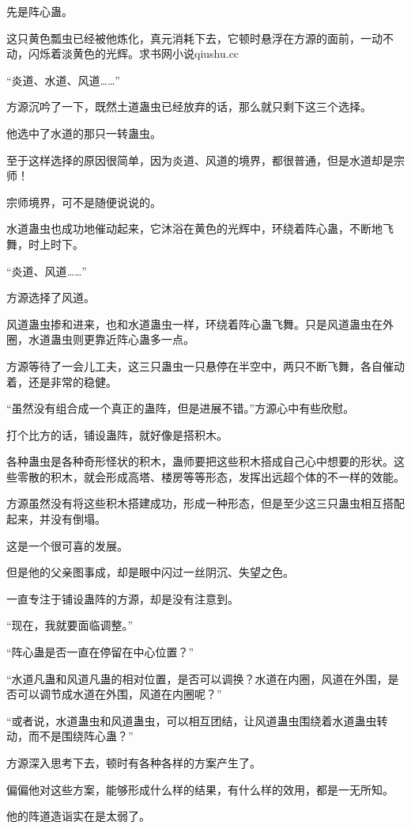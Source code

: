 \begin{this_body}
先是阵心蛊。

这只黄色瓢虫已经被他炼化，真元消耗下去，它顿时悬浮在方源的面前，一动不动，闪烁着淡黄色的光辉。求书网小说qiushu.cc

“炎道、水道、风道……”

方源沉吟了一下，既然土道蛊虫已经放弃的话，那么就只剩下这三个选择。

他选中了水道的那只一转蛊虫。

至于这样选择的原因很简单，因为炎道、风道的境界，都很普通，但是水道却是宗师！

宗师境界，可不是随便说说的。

水道蛊虫也成功地催动起来，它沐浴在黄色的光辉中，环绕着阵心蛊，不断地飞舞，时上时下。

“炎道、风道……”

方源选择了风道。

风道蛊虫掺和进来，也和水道蛊虫一样，环绕着阵心蛊飞舞。只是风道蛊虫在外圈，水道蛊虫则更靠近阵心蛊多一点。

方源等待了一会儿工夫，这三只蛊虫一只悬停在半空中，两只不断飞舞，各自催动着，还是非常的稳健。

“虽然没有组合成一个真正的蛊阵，但是进展不错。”方源心中有些欣慰。

打个比方的话，铺设蛊阵，就好像是搭积木。

各种蛊虫是各种奇形怪状的积木，蛊师要把这些积木搭成自己心中想要的形状。这些零散的积木，就会形成高塔、楼房等等形态，发挥出远超个体的不一样的效能。

方源虽然没有将这些积木搭建成功，形成一种形态，但是至少这三只蛊虫相互搭配起来，并没有倒塌。

这是一个很可喜的发展。

但是他的父亲图事成，却是眼中闪过一丝阴沉、失望之色。

一直专注于铺设蛊阵的方源，却是没有注意到。

“现在，我就要面临调整。”

“阵心蛊是否一直在停留在中心位置？”

“水道凡蛊和风道凡蛊的相对位置，是否可以调换？水道在内圈，风道在外围，是否可以调节成水道在外围，风道在内圈呢？”

“或者说，水道蛊虫和风道蛊虫，可以相互团结，让风道蛊虫围绕着水道蛊虫转动，而不是围绕阵心蛊？”

方源深入思考下去，顿时有各种各样的方案产生了。

偏偏他对这些方案，能够形成什么样的结果，有什么样的效用，都是一无所知。

他的阵道造诣实在是太弱了。


\end{this_body}
